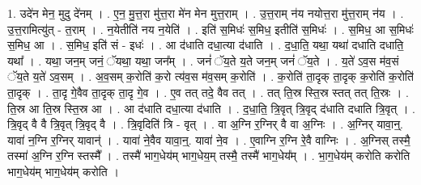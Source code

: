 \documentclass[17pt]{extarticle}
\begin{document}
1. उदे॑न मेन॒ मुदु दे॑नम् । . ए॒न॒ मु॒त्त॒रा मु॑त्त॒रा मे॑न मेन मुत्त॒राम् । . उ॒त्त॒राम् न॑य नयोत्त॒रा मु॑त्त॒राम् न॑य । . उ॒त्त॒रामित्यु॑त् - त॒राम् । . न॒येतीति॑ नय न॒येति॑ । . इति॑ स॒मिधः॑ स॒मिध॒ इतीति॑ स॒मिधः॑ । . स॒मिध॒ आ स॒मिधः॑ स॒मिध॒ आ । . स॒मिध॒ इति॑ सं - इधः॑ । . आ द॑धाति दधा॒त्या द॑धाति । . द॒धा॒ति॒ यथा॒ यथा॑ दधाति दधाति॒ यथा᳚ । . यथा॒ जन॒म् जनं॒ ॅयथा॒ यथा॒ जन᳚म् । . जनं॑ ॅय॒ते य॒ते जन॒म् जनं॑ ॅय॒ते । . य॒ते॑ ऽव॒स म॑व॒सं ॅय॒ते य॒ते॑ ऽव॒सम् । . अ॒व॒सम् क॒रोति॑ क॒रो त्य॑व॒स म॑व॒सम् क॒रोति॑ । . क॒रोति॑ ता॒दृक् ता॒दृक् क॒रोति॑ क॒रोति॑ ता॒दृक् । . ता॒दृ गे॒वैव ता॒दृक् ता॒दृ गे॒व । . ए॒व तत् तदे॒ वैव तत् । . तत् ति॒स्र स्ति॒स्र स्तत् तत् ति॒स्रः । . ति॒स्र आ ति॒स्र स्ति॒स्र आ । . आ द॑धाति दधा॒त्या द॑धाति । . द॒धा॒ति॒ त्रि॒वृत् त्रि॒वृद् द॑धाति दधाति त्रि॒वृत् । . त्रि॒वृद् वै वै त्रि॒वृत् त्रि॒वृद् वै । . त्रि॒वृदिति॑ त्रि - वृत् । . वा अ॒ग्नि र॒ग्निर् वै वा अ॒ग्निः । . अ॒ग्निर् यावा॒न्॒. यावा॑ न॒ग्नि र॒ग्निर् यावान्॑ । . यावा॑ ने॒वैव यावा॒न्॒. यावा॑ ने॒व । . ए॒वाग्नि र॒ग्नि रे॒वै वाग्निः । . अ॒ग्निस् तस्मै॒ तस्मा॑ अ॒ग्नि र॒ग्नि स्तस्मै᳚ । . तस्मै॑ भाग॒धेय॑म् भाग॒धेय॒म् तस्मै॒ तस्मै॑ भाग॒धेय᳚म् । . भा॒ग॒धेय॑म् करोति करोति भाग॒धेय॑म् भाग॒धेय॑म् करोति । \newline
\end{document}
